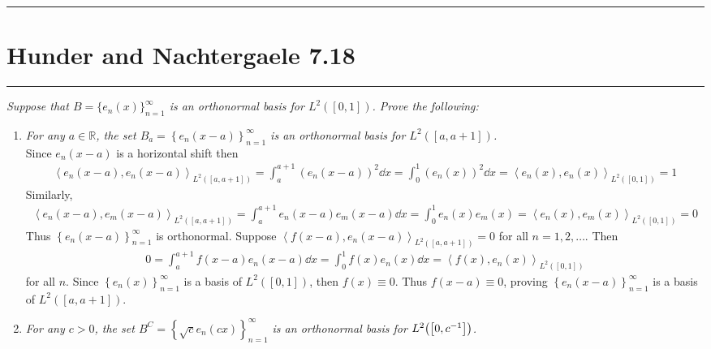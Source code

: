 \documentclass{article} %
\theoremstyle{plain}
\def\Rl{\mathbb{R}}
\newcommand{\VEC}[2]{\left\langle #1, #2 \right\rangle}
\newcommand{\problem}[1]{
\vspace{.375cm}
\begin{minipage}{\textwidth}
    \begin{center}
        \noindent\rule{5cm}{1pt}
    \end{center}
    \section{\bf #1}
    \begin{center}
        \noindent\rule{5cm}{1pt}
    \end{center}
    \vspace{0.25cm}
\end{minipage}
}
\numberwithin{equation}{section} %
\numberwithin{figure}{section} %
\numberwithin{table}{section} %
\begin{document}
\problem{Hunder and Nachtergaele 7.18}
\emph{Suppose that $B = \{e_n(x)\}_{n=1}^\infty$ is an orthonormal basis for $L^2([0,1])$.  Prove the following:}
\begin{enumerate}[ (a)]
    \item
        \emph{For any $a \in \Rl$, the set $B_a = \left\{e_n(x - a)\right\}_{n=1}^\infty$ is an orthonormal basis for $L^2([a, a+1])$.} \\

        Since $e_n(x-a)$ is a horizontal shift then
        \begin{align*}
            \VEC{e_n(x-a)}{e_n(x-a)}_{L^2([a, a+1])} = \int_a^{a+1}(e_n(x-a))^2\dd x = \int_0^1 (e_n(x))^2 \dd x = \VEC{e_n(x)}{e_n(x)}_{L^2([0, 1])} = 1
        \end{align*}
        Similarly,
        \begin{align*}
            \VEC{e_n(x-a)}{e_m(x-a)}_{L^2([a, a+1])} = \int_a^{a+1}e_n(x-a)e_m(x-a)\dd x = \int_0^1e_n(x)e_m(x) = \VEC{e_n(x)}{e_m(x)}_{L^2([0,1])} = 0
        \end{align*}
        Thus $\left\{e_n(x-a)\right\}_{n=1}^\infty$ is orthonormal.  Suppose $\VEC{f(x-a)}{e_n(x-a)}_{L^2([a, a+1])} = 0$ for all $n = 1, 2, \dots$.  Then
        \begin{align*}
            0 = \int_a^{a+1}f(x-a)e_n(x-a)\dd x = \int_0^1 f(x)e_n(x)\dd x = \VEC{f(x)}{e_n(x)}_{L^2([0,1])}
        \end{align*}
        for all $n$.  Since $\left\{e_n(x)\right\}_{n=1}^\infty$ is a basis of $L^2([0,1])$, then $f(x) \equiv 0$.  Thus $f(x-a) \equiv 0$, proving $\left\{e_n(x-a)\right\}_{n=1}^\infty$ is a basis of $L^2([a, a+1])$.
    \item
        \emph{For any $c > 0$, the set $B^C = \left\{\sqrt{c}e_n(cx)\right\}_{n=1}^\infty$ is an orthonormal basis for $L^2\qty(\qty[0, c^{-1}])$.} \\


\end{enumerate}
\end{document}
